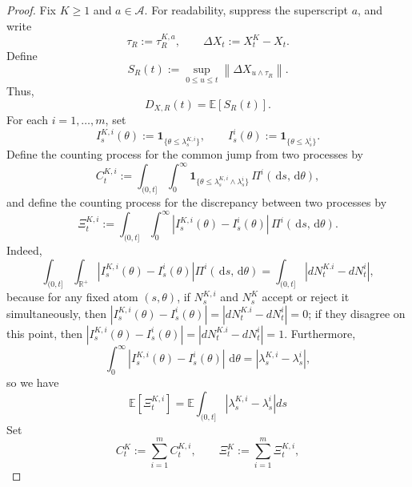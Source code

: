 \documentclass[10pt,a4paper]{amsart}
\newcommand{\E}{\mathbb E}
\newcommand{\abs}[1]{\left\lvert #1\right\rvert}
\newcommand{\dd}{\,\mathrm d}
\newcommand{\norm}[1]{\left\lVert #1 \right\rVert}
\begin{document}
\begin{proof}
Fix $K\geq1$ and $a\in\mathcal A$. For readability, suppress the
superscript $a$, and write
\[
    \tau_R:=\tau_R^{K,a},
    \qquad
    \Delta X_t:=X_t^K-X_t.
\]
Define
\[
S_R(t)
:=
\sup_{0\leq u\leq t}
\norm{\Delta X_{u\wedge\tau_R}}.
\]
Thus,
\[
    D_{X,R}(t)=\E[S_R(t)].
\] For each $i=1,\ldots,m$, set
\[
I_s^{K,i}(\theta)
:=
\mathbf 1_{\{\theta\leq\lambda_s^{K,i}\}},
\qquad
I_s^i(\theta)
:=
\mathbf 1_{\{\theta\leq\lambda_s^i\}}.
\]
Define the counting process for the common jump from two processes by
\[
C_t^{K,i}
:=
\int_{(0,t]}\int_0^\infty
\mathbf 1_{\{
    \theta\leq
    \lambda_s^{K,i}\wedge\lambda_s^i
\}}
\,\Pi^i(\dd s,\dd\theta),
\]
and define the counting process for the discrepancy between two processes by
\[
\Xi_t^{K,i}
:=
\int_{(0,t]}\int_0^\infty
\left|
    I_s^{K,i}(\theta)-I_s^i(\theta)
\right|
\,\Pi^i(\dd s,\dd\theta).
\] Indeed, 
\begin{equation*}
        \int_{(0,t]}\int_{\mathbb R^+}\left|I_s^{K,i}(\theta) - I_s^i(\theta)\right|\Pi^i(\dd s,\dd\theta) =\int_{(0,t]}|dN_t^{K.i} - dN_t^i|,
\end{equation*} because for any fixed atom $(s,\theta)$, if $N^{K,i}_s$ and $N^K_s$ accept or reject it simultaneously, then $\left|I_s^{K,i}(\theta) - I_s^i(\theta)\right| = |dN_t^{K.i} - dN_t^i| = 0$; if they disagree on this point, then $\left|I_s^{K,i}(\theta) - I_s^i(\theta)\right| = |dN_t^{K.i} - dN_t^i| = 1$. Furthermore, \[\int_0^\infty
\left|
    I_s^{K,i}(\theta)-I_s^i(\theta)
\right|
\,\dd\theta
=
\abs{\lambda_s^{K,i}-\lambda_s^i},\] so we have 
\begin{equation}
    \label{eq:discrepancy_intensity}
    \mathbb E[\Xi_t^{K,i}] = \mathbb E\int_{(0,t]}\abs{\lambda_s^{K,i}-\lambda_s^i}ds
\end{equation}
Set
\[
C_t^K:=\sum_{i=1}^m C_t^{K,i},
\qquad
\Xi_t^K:=\sum_{i=1}^m \Xi_t^{K,i},
\] 


\end{proof}
\end{document}
